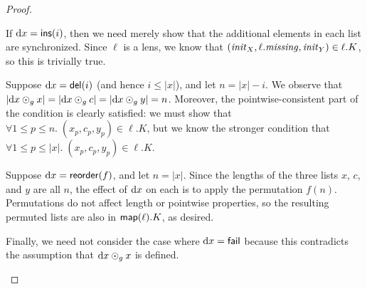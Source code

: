 \begin{proof}
\begin{itemize}
            If $\textrm{d} x = \mathsf{ins}(i)$, then we need merely show that the
            additional elements in each list are synchronized. Since $\ell$
            is a lens, we know that $(\mathit{init}_X,\ell.\mathit{missing},\mathit{init}_Y) \in
            \ell.K$, so this is trivially true.

            Suppose $\textrm{d} x = \mathsf{del}(i)$ (and hence $i\le|x|$), and let
            $n=|x|-i$. We observe that $|\textrm{d} x \odot_g x| = |\textrm{d} x \odot_g c| =
            |\textrm{d} x \odot_g y| = n$. Moreover, the pointwise-consistent part of
            the condition is clearly satisfied: we must show that $\forall 1
            \le p \le n.\;(x_p,c_p,y_p) \in \ell.K$, but we know the
            stronger condition that $\forall 1 \le p \le |x|.\;(x_p,c_p,y_p)
            \in \ell.K$.

            Suppose $\textrm{d} x = \mathsf{reorder}(f)$, and let $n = |x|$. Since the
            lengths of the three lists $x$, $c$, and $y$ are all $n$, the
            effect of $\textrm{d} x$ on each is to apply the permutation $f(n)$.
            Permutations do not affect length or pointwise properties, so
            the resulting permuted lists are also in $\mathsf{map}(\ell).K$, as
            desired.

            Finally, we need not consider the case where $\textrm{d} x = \mathsf{fail}$
            because this contradicts the assumption that $\textrm{d} x \odot_g x$ is
            defined.


\end{itemize}
\end{proof}

